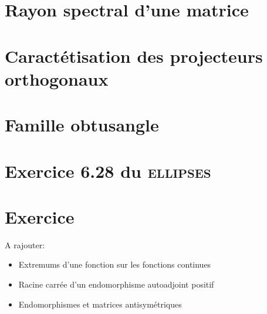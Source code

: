 \section{Rayon spectral d'une matrice} \label{rayon_spectral}


\section{Caractétisation des projecteurs orthogonaux}


\section{Famille obtusangle}


\section{Exercice 6.28 du \textsc{ellipses}}


\section{Exercice}


A rajouter:
\begin{itemize}
    \item Extremums d'une fonction sur les fonctions continues
    \item Racine carrée d'un endomorphisme autoadjoint positif
    \item Endomorphismes et matrices antisymétriques
\end{itemize}